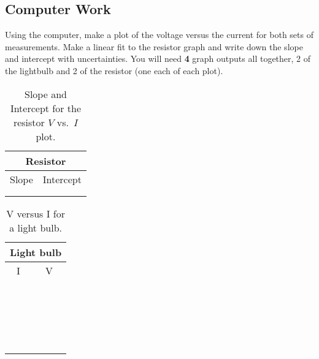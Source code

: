 \subsection{Computer Work}
Using the computer, make a plot of the voltage versus the current for both 
sets of measurements. Make a linear fit to the resistor graph and write
down the slope and intercept with uncertainties.  You will need {\bf 4}
graph outputs all together, 2 of the lightbulb and 2 of the resistor 
(one each of each plot).
\begin{table}[htb]
\begin{center}
\begin{tabular}{|c|c|}
\hline
\multicolumn{2}{|c|}{Resistor} \\
\hline
Slope & Intercept \\
\hline
\hspace*{5cm} & \hspace*{5cm} \\
& \\
\hline
\end{tabular}
\end{center}
\caption{Slope and Intercept for the resistor $V$ vs.\ $I$ plot.}
\end{table}

\pagebreak


\begin{table}[htb]
\begin{center}
\begin{tabular}{|c|c|}
\hline
\multicolumn{2}{|c|}{Light bulb}\\
\hline
I & V \\
\hline
\hspace*{5cm} & \hspace*{5cm} \\
& \\
\hline
& \\
& \\
\hline
& \\
& \\
\hline
& \\
& \\
\hline
& \\
& \\
\hline
& \\
& \\
\hline
& \\
& \\
\hline
& \\
& \\
\hline
& \\
& \\
\hline
& \\
& \\
\hline
\end{tabular}
\end{center}
\caption{V versus I for a light bulb.}
\label{tab:DC:lightbulb}
\end{table}



